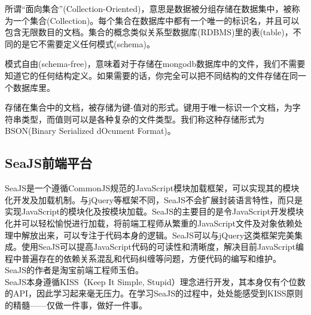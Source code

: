 \indent
所谓“面向集合”(Collection-Oriented)，意思是数据被分组存储在数据集中，被称为一个集合(Collection)。每个集合在数据库中都有一个唯一的标识名，并且可以包含无限数目的文档。集合的概念类似关系型数据库(RDBMS)里的表(table)，不同的是它不需要定义任何模式(schema)。

\indent
模式自由(schema-free)，意味着对于存储在mongodb数据库中的文件，我们不需要知道它的任何结构定义。如果需要的话，你完全可以把不同结构的文件存储在同一个数据库里。

\indent
存储在集合中的文档，被存储为键-值对的形式。键用于唯一标识一个文档，为字符串类型，而值则可以是各种复杂的文件类型。我们称这种存储形式为BSON(Binary Serialized dOcument Format)。

\subsection{SeaJS前端平台}
\indent
SeaJS是一个遵循CommonJS规范的JavaScript模块加载框架，可以实现其的模块化开发及加载机制。与jQuery等框架不同，SeaJS不会扩展封装语言特性，而只是实现JavaScript的模块化及按模块加载。SeaJS的主要目的是令JavaScript开发模块化并可以轻松愉悦进行加载，将前端工程师从繁重的JavaScript文件及对象依赖处理中解放出来，可以专注于代码本身的逻辑。SeaJS可以与jQuery这类框架完美集成。使用SeaJS可以提高JavaScript代码的可读性和清晰度，解决目前JavaScript编程中普遍存在的依赖关系混乱和代码纠缠等问题，方便代码的编写和维护。\\[0.1cm]
\indent
SeaJS的作者是淘宝前端工程师玉伯。\\
\indent
SeaJS本身遵循KISS（Keep It Simple, Stupid）理念进行开发，其本身仅有个位数的API，因此学习起来毫无压力。在学习SeaJS的过程中，处处能感受到KISS原则的精髓——仅做一件事，做好一件事。


\clearpage